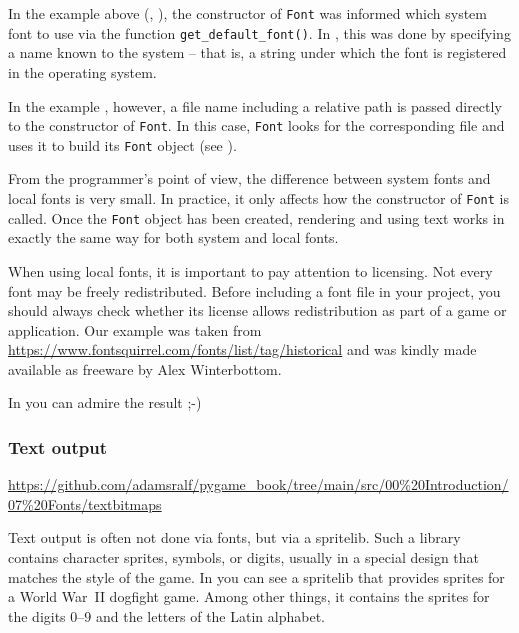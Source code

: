 In the example above (, ), the constructor of \texttt{Font} was informed which system font to use via the function \texttt{get\_default\_font()}. In , this was done by specifying a name known to the system -- that is, a string under which the font is registered in the operating system.

In the example , however, a file name including a relative path is passed directly to the constructor of \texttt{Font}. In this case, \texttt{Font} looks for the corresponding file and uses it to build its \texttt{Font} object (see ).

From the programmer’s point of view, the difference between system fonts and local fonts is very small. In practice, it only affects how the constructor of \texttt{Font} is called. Once the \texttt{Font} object has been created, rendering and using text works in exactly the same way for both system and local fonts.


When using local fonts, it is important to pay attention to licensing. Not every font may be freely redistributed. Before including a font file in your project, you should always check whether its license allows redistribution as part of a game or application. Our example was taken from \url{https://www.fontsquirrel.com/fonts/list/tag/historical} and was kindly made available as freeware by Alex Winterbottom.


In  you can admire the result ;-)


\subsubsection{Text output}
\begin{diskbox}
	\url{https://github.com/adamsralf/pygame_book/tree/main/src/00%20Introduction/07%20Fonts/textbitmaps}
\end{diskbox}

Text output is often not done via fonts, but via a \gls{spritelib}. Such a library contains character sprites, symbols, or digits, usually in a special design that matches the style of the game. In  you can see a spritelib that provides sprites for a World War~II dogfight game. Among other things, it contains the sprites for the digits $0$--$9$ and the letters of the Latin alphabet.

